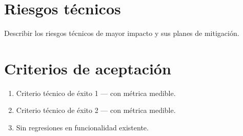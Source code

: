 \documentclass{../base/canon}
\begin{document}
\section{Riesgos técnicos}

\begin{WarningBox}
  Describir los riesgos técnicos de mayor impacto y sus planes de mitigación.
\end{WarningBox}

\section{Criterios de aceptación}

\begin{enumerate}
  \item Criterio técnico de éxito 1 — con métrica medible.
  \item Criterio técnico de éxito 2 — con métrica medible.
  \item Sin regresiones en funcionalidad existente.
\end{enumerate}


\ContactSignature
\end{document}
